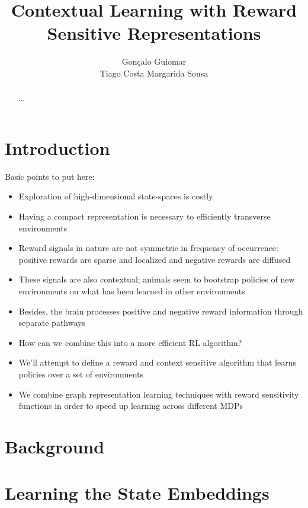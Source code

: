 \documentclass{article}
\title{Contextual Learning with Reward Sensitive Representations}
\author{
  Gonçalo Guiomar \\
  \And
  Tiago Costa
  \And
  Margarida Sousa
}
\begin{document}
\maketitle

\begin{abstract}
  ...
\end{abstract}

\section{Introduction}

Basic points to put here:

\begin{itemize}
  \item Exploration of high-dimensional state-spaces is costly
  \item Having a compact representation is necessary to efficiently transverse environments
  \item Reward signals in nature are not symmetric in frequency of occurrence: positive rewards are sparse and localized and negative rewards are diffused
  \item These signals are also contextual; animals seem to bootstrap policies of new environments on what has been learned in other environments
  \item Besides, the brain processes positive and negative reward information through separate pathways
  \item How can we combine this into a more efficient RL algorithm?
  \item We'll attempt to define a reward and context sensitive algorithm that learns policies over a set of environments
  \item We combine graph representation learning techniques with reward sensitivity functions in order to speed up learning across different MDPs
\end{itemize}

\section{Background}

\section{Learning the State Embeddings}

\end{document}
